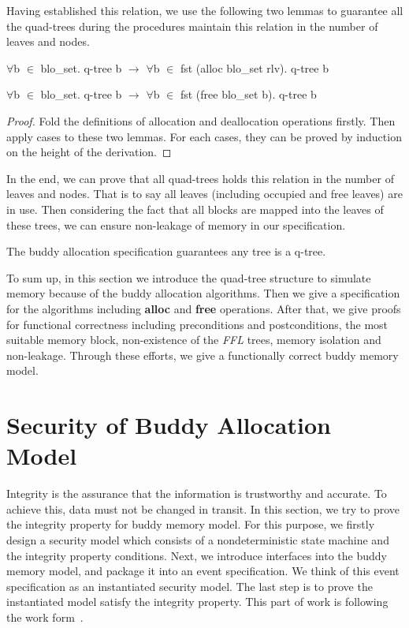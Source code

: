 \documentclass[runningheads]{llncs}
\begin{document}
Having established this relation, we use the following two lemmas to guarantee all the quad-trees during the procedures maintain this relation in the number of leaves and nodes.

\begin{lemma}
$\forall$b $\in$ blo\_set. q-tree b $\longrightarrow$ $\forall$b $\in$ fst (alloc blo\_set rlv). q-tree b
\end{lemma}

\begin{lemma}
$\forall$b $\in$ blo\_set. q-tree b $\longrightarrow$ $\forall$b $\in$ fst (free blo\_set b). q-tree b
\end{lemma}

\begin{proof}
Fold the definitions of allocation and deallocation operations firstly. Then apply cases to these two lemmas. For each cases, they can be proved by induction on the height of the derivation.
\end{proof}

In the end, we can prove that all quad-trees holds this relation in the number of leaves and nodes. That is to say all leaves (including occupied and free leaves) are in use. Then considering the fact that all blocks are mapped into the leaves of these trees, we can ensure non-leakage of memory in our specification.

\begin{theorem}
The buddy allocation specification guarantees any tree is a q-tree.
\end{theorem}

To sum up, in this section we introduce the quad-tree structure to simulate memory because of the buddy allocation algorithms. Then we give a specification for the algorithms including \textbf{alloc} and \textbf{free} operations. After that, we give proofs for functional correctness including preconditions and postconditions, the most suitable memory block, non-existence of the \emph{FFL} trees, memory isolation and non-leakage. Through these efforts, we give a functionally correct buddy memory model.


\section{Security of Buddy Allocation Model}
Integrity is the assurance that the information is trustworthy and accurate. To achieve this, data must not be changed in transit. In this section, we try to prove the integrity property for buddy memory model. For this purpose, we firstly design a security model which consists of a nondeterministic state machine and the integrity property conditions. Next, we introduce interfaces into the buddy memory model, and package it into an event specification. We think of this event specification as an instantiated security model. The last step is to prove the instantiated model satisfy the integrity property. This part of work is following the work form~\cite{reg_securitymodel}.
\end{document}
